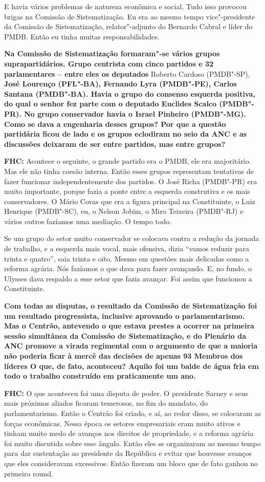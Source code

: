 E havia vários problemas de natureza econômica e social. Tudo isso
provocou brigas na Comissão de Sistematização. Eu era ao mesmo tempo
vice"-presidente da Comissão de Sistematização, relator"-adjunto do
Bernardo Cabral e líder do PMDB. Então eu tinha muitas
responsabilidades.

\textbf{Na Comissão de Sistematização formaram"-se vários grupos
suprapartidários. Grupo centrista com cinco partidos e 32 parlamentares
-- entre eles os deputados} Roberto Cardoso (PMDB"-SP), \textbf{José
Lourenço (PFL"-BA), Fernando Lyra (PMDB"-PE), Carlos Santana (PMDB"-BA).
Havia o grupo do consenso esquerda positiva, do qual o senhor fez parte
com o deputado Euclides Scalco (PMDB"-PR). No grupo conservador havia o
Israel Pinheiro (PMDB"-MG). Como se dava a engenharia desses grupos? Por
que a questão partidária ficou de lado e os grupos eclodiram no seio da
ANC e as discussões deixaram de ser entre partidos, mas entre grupos? }

\textbf{FHC:} Acontece o seguinte, o grande partido era o PMDB, ele era
majoritário. Mas ele não tinha coesão interna. Então esses grupos
representam tentativas de fazer funcionar independentemente dos
partidos. O José Richa (PMDB"-PR) era muito importante, porque fazia a
ponte entre a esquerda construtiva e os mais conservadores. O Mário
Covas que era a figura principal na Constituinte, o Luiz Henrique
(PMDB"-SC), eu, o Nelson Jobim, o Miro Teixeira (PMDB"-RJ) e vários outros
fazíamos uma mediação. O tempo todo.

Se um grupo do setor muito conservador se colocava contra a redução da
jornada de trabalho, e a esquerda mais vocal, mais ofensiva, dizia
``vamos reduzir para trinta e quatro'', saia trinta e oito. Mesmo em
questões mais delicadas como a reforma agrária. Nós fazíamos o que dava
para fazer avançando. E, no fundo, o Ulysses dava respaldo a esse setor
que fazia avançar. Foi assim que funcionou a Constituinte.

\textbf{Com todas as disputas, o resultado da Comissão de Sistematização
foi um resultado progressista, inclusive aprovando o parlamentarismo.
Mas o Centrão, antevendo o que estava prestes a ocorrer na primeira
sessão simultânea da Comissão de Sistematização, e do Plenário da ANC
promove a virada regimental com o argumento de que a maioria não poderia
ficar à mercê das decisões de apenas 93 Membros dos líderes O que, de
fato, aconteceu? Aquilo foi um balde de água fria em todo o trabalho
construído em praticamente um ano.}

\textbf{FHC:} O que aconteceu foi uma disputa de poder. O presidente
Sarney e seus mais próximos aliados ficaram temerosos, no fim do
mandato, do parlamentarismo. Então o Centrão foi criado, e aí, ao redor
disso, se colocaram as forças econômicas. Nessa época os setores
empresariais eram muito ativos e tinham muito medo de avanços nos
direitos de propriedade, e a reforma agrária foi muito discutida sobre
esse ângulo. Então eles se organizaram ao mesmo tempo para dar
sustentação ao presidente da República e evitar que houvesse avanços que
eles consideravam excessivos. Então fizeram um bloco que de fato ganhou
no primeiro round.

